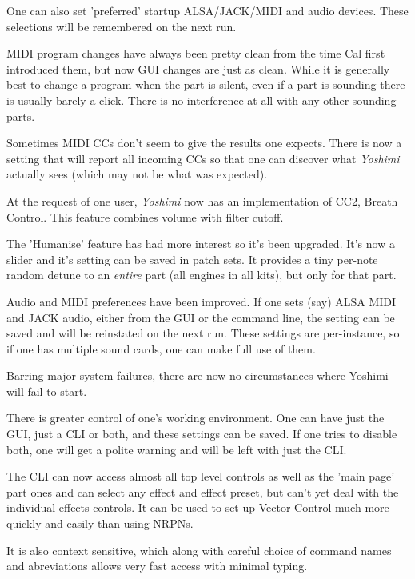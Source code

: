 \documentclass[
 11pt,
 twoside,
 a4paper,
 headinclude,
 footinclude,
 final                                 %
]{article}
\begin{document}
   One can also set 'preferred' startup ALSA/JACK/MIDI and audio devices.
   These selections will be remembered on the next run.

   MIDI program changes have always been pretty clean from the time Cal first
   introduced them, but now GUI changes are just as clean. While it is
   generally best to change a program when the part is silent, even if a part
   is sounding there is usually barely a click. There is no interference at all
   with any other sounding parts.

   Sometimes MIDI CCs don't seem to give the results one expects. There is
   now a setting that will report all incoming CCs so that one can discover what
   \textsl{Yoshimi} actually sees (which may not be what was expected).

   At the request of one user, \textsl{Yoshimi} now has an
   implementation of CC2, Breath Control.
   This feature combines volume with
   filter cutoff.

   The 'Humanise' feature has had more interest so it's been upgraded. It's now
   a slider and it's setting can be saved in patch sets. It provides a tiny
   per-note random detune to an \textsl{entire} part (all engines in all kits),
   but only for that part.

   Audio and MIDI preferences have been improved. If one sets (say) ALSA MIDI
   and JACK audio, either from the GUI or the command line, the setting can be
   saved and will be reinstated on the next run. These settings are
   per-instance, so if one has multiple sound cards, one can make full use of
   them.

   Barring major system failures, there are now no circumstances where Yoshimi
   will fail to start.

   There is greater control of one's working environment. One can have just the
   GUI, just a CLI or both, and these settings can be saved. If one tries to
   disable both, one will get a polite warning and will be left with just the
   CLI.

   The CLI can now access almost all top level controls as well as the 'main
   page' part ones and can select any effect and effect preset, but can't yet
   deal with the individual effects controls. It can be used to set up Vector
   Control much more quickly and easily than using NRPNs.

   It is also context sensitive, which along with careful choice of command
   names and abreviations allows very fast access with minimal typing.
\end{document}
